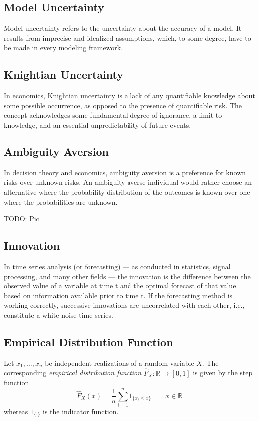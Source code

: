 \subsection*{Model Uncertainty}
Model uncertainty refers to the uncertainty about the accuracy of a model. It
results from imprecise and idealized assumptions, which, to some degree, have
to be made in every modeling framework.

\subsection*{Knightian Uncertainty}
In economics, Knightian uncertainty is a lack of any quantifiable knowledge 
about some possible occurrence, as opposed to the presence of quantifiable
risk. The concept acknowledges some fundamental degree of ignorance, a limit 
to knowledge, and an essential unpredictability of future events.

\subsection*{Ambiguity Aversion}
In decision theory and economics, ambiguity aversion is a preference for known 
risks over unknown risks. An ambiguity-averse individual would rather choose 
an alternative where the probability distribution of the outcomes is known 
over one where the probabilities are unknown.

TODO: Pic

\subsection*{Innovation}
In time series analysis (or forecasting) — as conducted in statistics, signal processing, and many other fields — the innovation is the difference between the observed value of a variable at time t and the optimal forecast of that value based on information available prior to time t. If the forecasting method is working correctly, successive innovations are uncorrelated with each other, i.e., constitute a white noise time series.
\subsection*{Empirical Distribution Function}
Let $x_1, \dots, x_n$ be independent realizations of a random variable $X$. The
corresponding \textit{empirical distribution function} 
$\hat{F}_X : \mathbb{R} \to [0, 1]$ is given by the step function
\[
  \hat{F}_X(x) = \frac{1}{n} \sum_{i=1}^n 1_{\{x_i \leq x\}} \qquad x\in
  \mathbb{R}
\]
whereas $1_{\{\cdot\}}$ is the indicator function.

